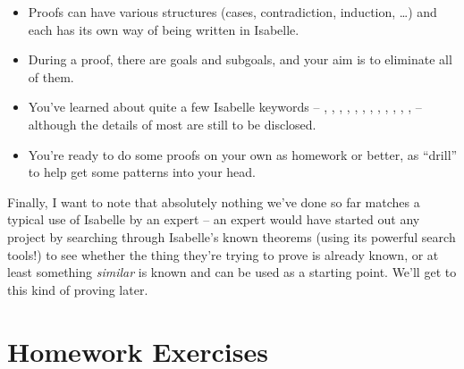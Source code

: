 \begin{itemize}
    \item Proofs can have various structures (cases, contradiction, induction, \ldots ) and each has its own way of being written in Isabelle. 
    \item During a proof, there are goals and subgoals, and your aim is to eliminate all of them. 
    \item You've learned about quite a few Isabelle keywords -- , , , , , , , , , , , ,  -- although the details of most are still to be disclosed. 
    \item You're ready to do some proofs on your own as homework or better, as ``drill'' to help get some patterns into your head. 
\end{itemize}

Finally, I want to note that absolutely nothing we've done so far matches a typical use of Isabelle by an expert -- an expert would have started out any project by searching through Isabelle's known theorems (using its powerful search tools!) to see whether the thing they're trying to prove is already known, or at least something \textit{similar} is known and can be used as a starting point. We'll get to this kind of proving later. 

\section{Homework Exercises}

